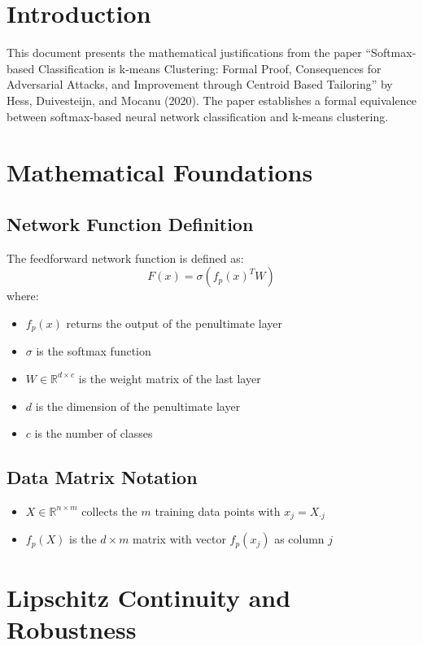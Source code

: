 
\section{Introduction}

This document presents the mathematical justifications from the paper ``Softmax-based Classification is k-means Clustering: Formal Proof, Consequences for Adversarial Attacks, and Improvement through Centroid Based Tailoring'' by Hess, Duivesteijn, and Mocanu (2020). The paper establishes a formal equivalence between softmax-based neural network classification and k-means clustering.

\section{Mathematical Foundations}

\subsection{Network Function Definition}

The feedforward network function is defined as:
\begin{equation}
F(x) = \sigma(f_p(x)^T W)
\end{equation}
where:
\begin{itemize}
\item $f_p(x)$ returns the output of the penultimate layer
\item $\sigma$ is the softmax function
\item $W \in \mathbb{R}^{d \times c}$ is the weight matrix of the last layer
\item $d$ is the dimension of the penultimate layer
\item $c$ is the number of classes
\end{itemize}

\subsection{Data Matrix Notation}

\begin{itemize}
\item $X \in \mathbb{R}^{n \times m}$ collects the $m$ training data points with $x_j = X_{\cdot j}$
\item $f_p(X)$ is the $d \times m$ matrix with vector $f_p(x_j)$ as column $j$
\end{itemize}

\section{Lipschitz Continuity and Robustness}

